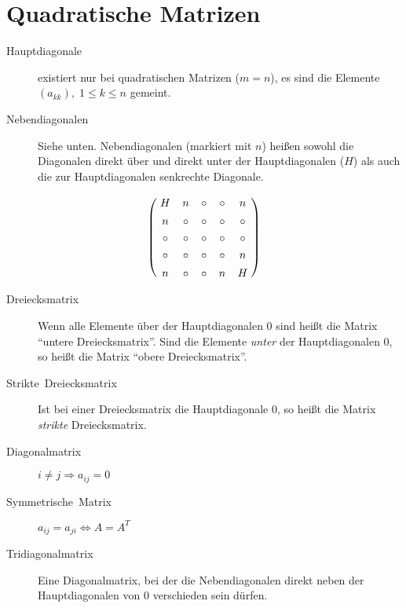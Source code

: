 \section{Quadratische Matrizen}
\begin{description}
  \item [{Hauptdiagonale}] 
	existiert nur bei quadratischen Matrizen ($m=n$), es sind die Elemente $(a_{kk}),\; 1\leq k\leq n$ gemeint.
  \item [{Nebendiagonalen}] 
	Siehe unten.
	Nebendiagonalen (markiert mit $n$) heißen sowohl die Diagonalen direkt über und direkt unter der Hauptdiagonalen ($H$) als auch die zur Hauptdiagonalen senkrechte Diagonale.
\end{description}
\[
  \xySep{5pt}
  \left(\vcenter{\xymatrix{
  H\ar[ddddrrrr]    & n\ar@{.>}[dddrrr] & \circ & \circ & n\ar@{.>}[ddddllll] \\
  n\ar@{.>}[dddrrr] & \circ             & \circ & \circ & \circ               \\
  \circ             & \circ             & \circ & \circ & \circ               \\
  \circ             & \circ             & \circ & \circ & n                   \\
  n                 & \circ             & \circ & n     & H
  }
  }\right)
\]

\begin{description}
  \item [{Dreiecksmatrix}] 
	Wenn alle Elemente über der Hauptdiagonalen 0 sind heißt die Matrix \enquote{untere Dreiecksmatrix}.
	Sind die Elemente \emph{unter} der Hauptdiagonalen 0, so heißt die Matrix \enquote{obere Dreiecksmatrix}.
  \item [{Strikte~Dreiecksmatrix}] 
	Ist bei einer Dreiecksmatrix die Hauptdiagonale 0, so heißt die Matrix \emph{strikte} Dreiecksmatrix.
  \item [{Diagonalmatrix}] 
	$i\neq j\Rightarrow a_{ij}=0$
  \item [{Symmetrische~Matrix}] 
	$a_{ij}=a_{ji} \iff A=A^{T}$
  \item [{Tridiagonalmatrix}] 
    Eine Diagonalmatrix, bei der die Nebendiagonalen direkt neben der Hauptdiagonalen von 0 verschieden sein dürfen.
\end{description}

